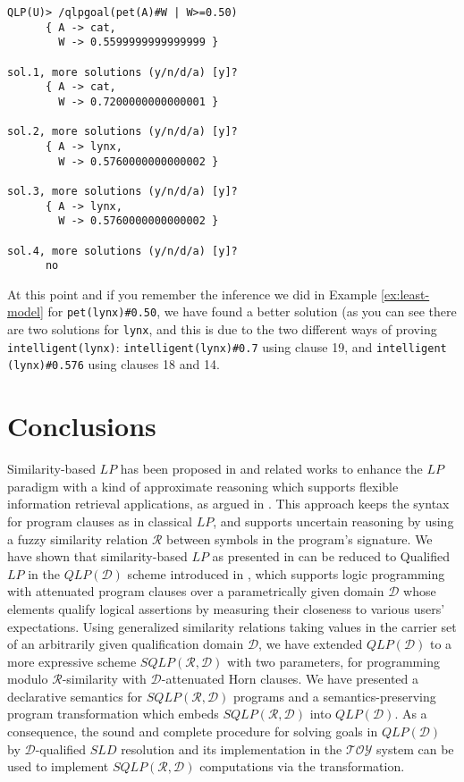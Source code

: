 \documentclass{sigplanconf}
\newcommand{\toy}{\mathcal{TOY}} \newcommand{\NAT}{\mathbb{N}} \newcommand{\REAL}{\mathbb{R}}
\newcommand{\qdom}{\mathcal{D}} \newcommand{\dqdom}{D \setminus \{\bot\}} \newcommand{\bqdom}{(D \setminus \{\bot\}) \uplus \{?\}}
\newcommand{\simrel}{\mathcal{R}}
\newcommand{\qlp}[1]{QLP({#1})} \newcommand{\slp}[2]{SLP({#1,#2})} \newcommand{\sqlp}[2]{SQLP({#1,#2})} \newcommand{\bqlp}[1]{BQLP({#1})} \newcommand{\clp}[1]{CLP({#1})}
\theoremstyle{definition}
\theoremstyle{plain}
\begin{document}
\begin{verbatim}
QLP(U)> /qlpgoal(pet(A)#W | W>=0.50)
      { A -> cat,
        W -> 0.5599999999999999 }

sol.1, more solutions (y/n/d/a) [y]?
      { A -> cat,
        W -> 0.7200000000000001 }

sol.2, more solutions (y/n/d/a) [y]?
      { A -> lynx,
        W -> 0.5760000000000002 }

sol.3, more solutions (y/n/d/a) [y]?
      { A -> lynx,
        W -> 0.5760000000000002 }

sol.4, more solutions (y/n/d/a) [y]?
      no
\end{verbatim}

At this point and if you remember the inference we did in Example \ref{ex:least-model} for \texttt{pet(lynx)\#0.50}, we have found a better solution (as you can see there are two solutions for \texttt{lynx}, and this is due to the two different ways of proving \texttt{intelligent(lynx)}: \texttt{intelligent(lynx)\#0.7} using clause 19, and \texttt{intelligent (lynx)\#0.576} using clauses 18 and 14.

\section{Conclusions} \label{Conclusions}

Similarity-based $LP$ has been proposed in \cite{Ses02} and related works to enhance the $LP$ paradigm with a kind of approximate reasoning which supports flexible information retrieval applications, as argued in \cite{LSS04,MOV04}. This approach keeps the syntax for program  clauses as in classical $LP$, and supports uncertain reasoning by using a fuzzy similarity relation $\simrel$ between symbols in the program's signature. We have shown that similarity-based $LP$ as presented in \cite{Ses02} can be reduced to Qualified $LP$ in the $\qlp{\qdom}$ scheme introduced in \cite{RR08}, which supports  logic programming with attenuated program clauses over a parametrically given domain $\qdom$  whose elements  qualify logical assertions by measuring their closeness to various users' expectations. Using  generalized similarity relations taking values in the carrier set of an
arbitrarily  given qualification domain $\qdom$,  we  have extended $\qlp{\qdom}$ to a more expressive scheme $\sqlp{\simrel}{\qdom}$ with two parameters, for programming modulo $\simrel$-similarity with $\qdom$-attenuated Horn clauses. We have presented a declarative semantics for $\sqlp{\simrel}{\qdom}$ programs and a semantics-preserving program transformation which embeds $\sqlp{\simrel}{\qdom}$ into $\qlp{\qdom}$. As a consequence, the sound and complete procedure for solving goals in $\qlp{\qdom}$ by $\qdom$-qualified $SLD$ resolution and its implementation in the
$\toy$ system \cite{RR08} can be used to implement $\sqlp{\simrel}{\qdom}$ computations via the transformation.
\end{document}
